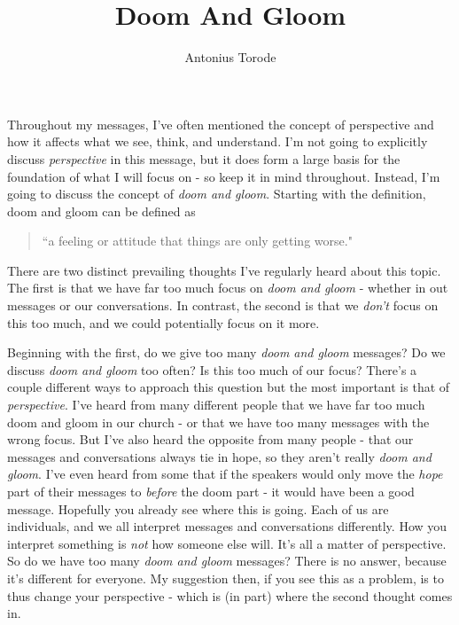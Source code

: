 \documentclass[10pt]{article}
\title{Doom And Gloom}
\author{Antonius Torode}
\begin{document}
\maketitle
\thispagestyle{fancy}

\begin{multicols}{2}

Throughout my messages, I've often mentioned the concept of perspective and how it affects what we see, think, and understand. I'm not going to explicitly discuss \textit{perspective} in this message, but it does form a large basis for the foundation of what I will focus on - so keep it in mind throughout. Instead, I'm going to discuss the concept of \textit{doom and gloom}. Starting with the definition, doom and gloom can be defined as 

\begin{quotation}
	``a feeling or attitude that things are only getting worse." \cite{Dictionary}
\end{quotation}

There are two distinct prevailing thoughts I've regularly heard about this topic. The first is that we have far too much focus on \textit{doom and gloom} - whether in out messages or our conversations. In contrast, the second is that we \textit{don't} focus on this too much, and we could potentially focus on it more.

Beginning with the first, do we give too many \textit{doom and gloom} messages? Do we discuss \textit{doom and gloom} too often? Is this too much of our focus? There's a couple different ways to approach this question but the most important is that of \textit{perspective}. I've heard from many different people that we have far too much doom and gloom in our church - or that we have too many messages with the wrong focus. But I've also heard the opposite from many people - that our messages and conversations always tie in hope, so they aren't really \textit{doom and gloom}. I've even heard from some that if the speakers would only move the \textit{hope} part of their messages to \textit{before} the doom part - it would have been a good message. Hopefully you already see where this is going. Each of us are individuals, and we all interpret messages and conversations differently. How you interpret something is \textit{not} how someone else will. It's all a matter of perspective. So do we have too many \textit{doom and gloom} messages? There is no answer, because it's different for everyone. My suggestion then, if you see this as a problem, is to thus change your perspective - which is (in part) where the second thought comes in.


\end{multicols}
\end{document}
